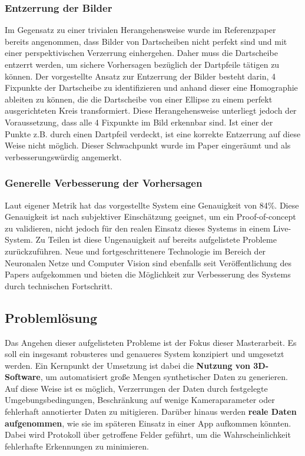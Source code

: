 \subsubsection{Entzerrung der Bilder}
\label{sec:ziele:schwachstellen:entzerrung}

Im Gegensatz zu einer trivialen Herangehensweise wurde im Referenzpaper bereits angenommen, dass Bilder von Dartscheiben nicht perfekt sind und mit einer perspektivischen Verzerrung einhergehen. Daher muss die Dartscheibe entzerrt werden, um sichere Vorhersagen bezüglich der Dartpfeile tätigen zu können. Der vorgestellte Ansatz zur Entzerrung der Bilder besteht darin, 4 Fixpunkte der Dartscheibe zu identifizieren und anhand dieser eine Homographie ableiten zu können, die die Dartscheibe von einer Ellipse zu einem perfekt ausgerichteten Kreis transformiert. Diese Herangehensweise unterliegt jedoch der Voraussetzung, dass alle 4 Fixpunkte im Bild erkennbar sind. Ist einer der Punkte z.B. durch einen Dartpfeil verdeckt, ist eine korrekte Entzerrung auf diese Weise nicht möglich. Dieser Schwachpunkt wurde im Paper eingeräumt und als verbesserungswürdig angemerkt.

\subsubsection{Generelle Verbesserung der Vorhersagen}
\label{sec:ziele:schwachstellen:verbesserung}

Laut eigener Metrik hat das vorgestellte System eine Genauigkeit von 84\%. Diese Genauigkeit ist nach subjektiver Einschätzung geeignet, um ein Proof-of-concept zu validieren, nicht jedoch für den realen Einsatz dieses Systems in einem Live-System. Zu Teilen ist diese Ungenauigkeit auf bereits aufgelistete Probleme zurückzuführen. Neue und fortgeschrittenere Technologie im Bereich der Neuronalen Netze und Computer Vision sind ebenfalls seit Veröffentlichung des Papers aufgekommen und bieten die Möglichkeit zur Verbesserung des Systems durch technischen Fortschritt.


\subsection{Problemlösung}
\label{sec:ziele:problemlösung}

Das Angehen dieser aufgelisteten Probleme ist der Fokus dieser Masterarbeit. Es soll ein insgesamt robusteres und genaueres System konzipiert und umgesetzt werden. Ein Kernpunkt der Umsetzung ist dabei die \textbf{Nutzung von 3D-Software}, um automatisiert große Mengen synthetischer Daten zu generieren. Auf diese Weise ist es möglich, Verzerrungen der Daten durch festgelegte Umgebungsbedingungen, Beschränkung auf wenige Kameraparameter oder fehlerhaft annotierter Daten zu mitigieren. Darüber hinaus werden \textbf{reale Daten aufgenommen}, wie sie im späteren Einsatz in einer App aufkommen könnten. Dabei wird Protokoll über getroffene Felder geführt, um die Wahrscheinlichkeit fehlerhafte Erkennungen zu minimieren.

